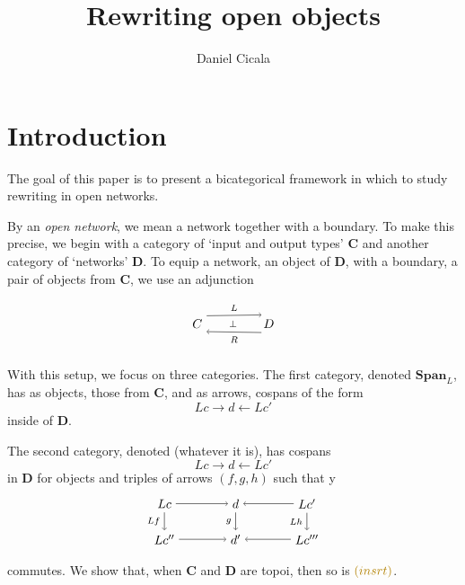 \documentclass{amsart}
\author{Daniel Cicala}
\title{Rewriting open objects}
\newcommand{\cat}[1]{\mathbf{#1}}
\newcommand{\Span}{\mathbf{Span}}
\newcommand{\edit}[1]{\textcolor{editcolour}{(#1)}}
\theoremstyle{remark}
\theoremstyle{definition}
\begin{document}
\maketitle{} 


\section{Introduction}
\label{sec:introduction}

The goal of this paper is to present a bicategorical framework in
which to study rewriting in open networks.

By an \emph{open network}, we mean a network together with a boundary.
To make this precise, we begin with a category of `input and output
types' $\cat{C}$ and another category of `networks' $ \cat{D} $.  To
equip a network, an object of $\cat{D}$, with a boundary, a pair of
objects from $\cat{C}$, we use an adjunction

\[ %
\begin{tikzpicture} 
  \node (C) at (0,0) {$ C $};
  \node (D) at (2,0) {$ D $};
  \node at (1,0) {\scriptsize $ \perp $};
  \draw [->] (C.40) to 
  node [above] {\scriptsize $ L $} (D.130);
  \draw [<-] (C.-40) to 
  node [below] {\scriptsize $ R $} (D.-130);
\end{tikzpicture}
\]

With this setup, we focus on three categories.  The first category,
denoted $ \Span_L $, has as objects, those from $ \cat{C} $, and as
arrows, cospans of the form
\[
Lc \to d \gets Lc'
\]
inside of $ \cat{D} $. 

The second category, denoted \edit{whatever it is}, has cospans
\[
Lc \to d \gets Lc'
\]
in $ \cat{ D } $ for objects and triples of arrows $ ( f , g , h ) $
such that y
\[ %
\begin{tikzpicture}
  \node (Lc) at (-2,1) {$ Lc $};
  \node (d) at (0,1) {$ d $};
  \node (Lc') at (2,1) {$ Lc' $};
  \node (Lc'') at (-2,0) {$ Lc'' $};
  \node (d') at (0,0) {$ d' $};
  \node (Lc''') at (2,0) {$ Lc''' $};
  \draw [->] (Lc) to (d);
  \draw [->] (Lc') to (d);
  \draw [->] (Lc'') to (d');
  \draw [->] (Lc''') to (d');
  \draw [->] (Lc) to node [left] {\scriptsize $ Lf $ } (Lc'');
  \draw [->] (d) to node [left] { \scriptsize $ g $ }(d');
  \draw [->] (Lc') to node [left] { \scriptsize $ Lh $ }(Lc''');
\end{tikzpicture}
\]
commutes.
We show that, when $ \cat{C} $ and
$ \cat{D} $ are topoi, then so is $ \edit{insrt} $.
\end{document}
